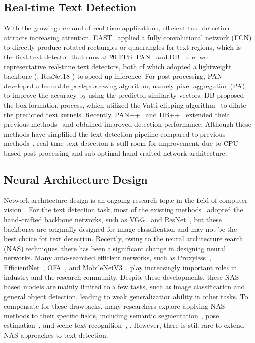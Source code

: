 \documentclass[lettersize,journal]{IEEEtran}
\begin{document}
\subsection{Real-time Text Detection}
With the growing demand of real-time applications, efficient text detection attracts increasing attention.
EAST~\cite{zhou2017east} applied a fully convolutional network (FCN) to directly produce rotated rectangles or quadrangles for text regions, which is the first text detector that runs at 20 FPS.
PAN~\cite{wang2019efficient} and DB~\cite{liao2020real} are two representative real-time text detectors, both of which adopted a lightweight backbone (\ie, ResNet18 \cite{he2016deep}) to speed up inference. 
For post-processing, PAN developed a learnable post-processing algorithm, namely pixel aggregation (PA), to improve the accuracy by using the predicted similarity vectors.
DB proposed the box formation process, which utilized the Vatti clipping algorithm~\cite{vatti1992generic} to dilate the predicted text kernels.
Recently, PAN++~\cite{wang2021pan++} and DB++~\cite{liao2022real} extended their previous methods~\cite{wang2019efficient,liao2020real} and obtained improved detection performance.
Although these methods have simplified the text detection pipeline compared to previous methods~\cite{long2018textsnake,wang2019shape,zhou2017east,xie2019scene}, 
real-time text detection is still room for improvement, due to CPU-based post-processing and sub-optimal hand-crafted network architecture.


\subsection{Neural Architecture Design}
Network architecture design is an ongoing research topic in the field of computer vision~\cite{wang2021pvtv2,ding2021repvgg,chen2022vision}. 
For the text detection task, most of the existing methods~\cite{zhou2017east,wang2019efficient,liao2020real,wang2019shape,tian2016detecting} adopted the hand-crafted backbone networks, such as VGG~\cite{simonyan2014very} and ResNet~\cite{he2016deep}, but these backbones are originally designed for image classification and may not be the best choice for text detection.
Recently, owing to the neural architecture search (NAS) techniques, there has been a significant change in designing neural networks.
Many auto-searched efficient networks, such as Proxyless~\cite{cai2018proxylessnas}, EfficientNet~\cite{tan2019efficientnet}, OFA~\cite{cai2019once}, and MobileNetV3~\cite{howard2019searching}, play increasingly important roles in industry and the research community. 
Despite these developments, these NAS-based models are mainly limited to a few tasks, such as image classification and general object detection, leading to weak generalization ability in other tasks.
To compensate for these drawbacks, many researchers explore applying NAS methods to their specific fields, including semantic segmentation~\cite{liu2019auto}, pose estimation~\cite{xu2021vipnas}, and scene text recognition~\cite{hong2020memory,zhang2020autostr}, \etc.
However, there is still rare to extend NAS approaches to text detection. 
\end{document}
